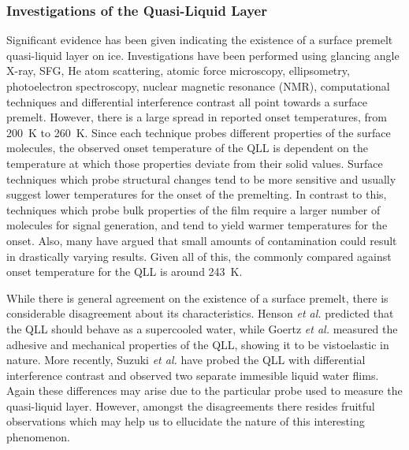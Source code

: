 \subsubsection{Investigations of the Quasi-Liquid Layer}
Significant evidence has been given indicating the existence of a
surface premelt quasi-liquid layer on ice. Investigations have been
performed using glancing angle X-ray\cite{Lied1994, Dosch1995},
SFG\cite{Wei2001}, He atom scattering\cite{Suter2006}, atomic force
microscopy\cite{Goertz2009,Doppenschmidt2000},
ellipsometry\cite{Furukawa1997}, photoelectron
spectroscopy\cite{Bluhm2002}, nuclear magnetic resonance
(NMR)\cite{Dec2009,Dec2012}, computational
techniques\cite{Conde2008,Neshyba2009,Gladich2011,Pfalzgraff2011,Gladich2015,Park2010,Shepherd2012,Limmer2014,Persson2015}
and differential interference
contrast\cite{Sazaki2011,Asakawa2016,Sazaki2013} all point towards a
surface premelt. However, there is a large spread in reported onset
temperatures, from 200~K to 260~K. Since each technique probes
different properties of the surface molecules, the observed onset
temperature of the QLL is dependent on the temperature at which those
properties deviate from their solid values. Surface techniques which
probe structural changes tend to be more sensitive and usually suggest
lower temperatures for the onset of the premelting. In contrast to
this, techniques which probe bulk properties of the film require a
larger number of molecules for signal generation, and tend to yield
warmer temperatures for the onset. Also, many have argued that small
amounts of contamination could result in drastically varying
results.\cite{Elbaum1993,Wettlaufer1999} Given all of this, the
commonly compared against onset temperature for the QLL is around
243~K.

While there is general agreement on the existence of a
surface premelt, there is considerable disagreement about its
characteristics. Henson \textit{et al.} predicted that the QLL should
behave as a supercooled water\cite{Henson2005}, while Goertz
\textit{et al.}  measured the adhesive and mechanical properties of
the QLL, showing it to be vistoelastic in nature.\cite{Goertz2009}
More recently, Suzuki \textit{et al.}  have probed the QLL with
differential interference contrast and observed two separate immesible
liquid water flims.\cite{Sazaki2012,Asakawa2016,Sazaki2013} Again
these differences may arise due to the particular probe used to
measure the quasi-liquid layer. However, amongst the disagreements
there resides fruitful observations which may help us to ellucidate
the nature of this interesting phenomenon. 



